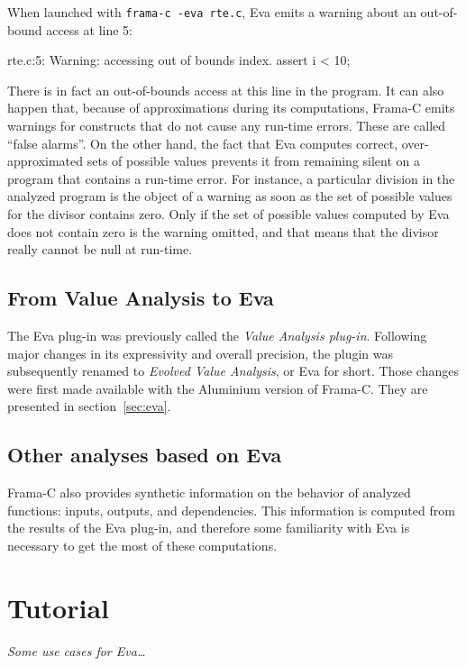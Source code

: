 \documentclass[web]{frama-c-book}
\newcommand{\Eva}{\textsf{Eva}}
\begin{document}
When launched with \lstinline|frama-c -eva rte.c|,
\Eva{} emits a warning about an out-of-bound access at line 5:
\begin{logs}
 rte.c:5: Warning: accessing out of bounds index. assert i < 10;
\end{logs}
There is in fact an out-of-bounds access at this line in the program.
It can also happen that, because of approximations during its computations,
Frama-C emits warnings for constructs
that do not cause any run-time errors. These are called ``false alarms''.
On the other hand, the fact that \Eva{}
computes correct, over-approximated sets of possible values prevents it
from remaining silent on a program that contains a run-time error. For 
instance, a particular division in the analyzed program
is the object of a warning 
as soon as the set of possible values for the divisor
contains zero. Only
if the set of possible values computed by \Eva{}
does not contain zero is the warning omitted, and
that means that the divisor really cannot be null at run-time.

\section{From Value Analysis to \Eva{}}

The \Eva{} plug-in was previously called the \emph{Value Analysis plug-in}.
Following major changes in its expressivity and overall precision,
the plugin was subsequently renamed to \emph{Evolved Value Analysis}, or
\Eva{} for short. Those changes were first made available with the
Aluminium version of Frama-C. They are presented in section~\ref{sec:eva}.

\section{Other analyses based on \Eva{}}

Frama-C also provides
synthetic information on the behavior of analyzed functions:
inputs, outputs, and dependencies. This information is computed
from the results of the \Eva{} plug-in,
and therefore some familiarity with \Eva{}
is necessary to get the most of these computations.

\chapter{Tutorial}\label{tutorial}
\vspace{2cm}

{\em Some use cases for \Eva{}\ldots}
\end{document}
